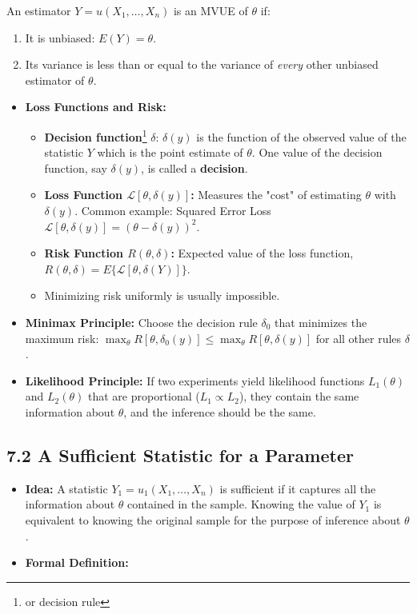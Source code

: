 \begin{definition}
An estimator $Y = u(X_1, \dots, X_n)$ is an MVUE of $\theta$ if:
	\begin{enumerate}
		\item It is unbiased: $E(Y) = \theta$.
		\item Its variance is less than or equal to the variance of \textit{every} other unbiased estimator of $\theta$.
	\end{enumerate}
\end{definition}
\begin{itemize}
	\item \textbf{Loss Functions and Risk:}
	\begin{itemize}
		\item \textbf{Decision function}\footnote{or decision rule} $\delta$: $\delta (y)$ is the function of the observed value of the statistic $Y$ which is the point estimate of $\theta$. One value of the decision function, say $\delta(y)$, is called a \textbf{decision}.
		\item \textbf{Loss Function $\mathcal{L}[\theta, \delta(y)]$:} Measures the "cost" of estimating $\theta$ with $\delta(y)$. Common example: Squared Error Loss $\mathcal{L}[\theta, \delta(y)] = (\theta - \delta(y))^2$.
		\item \textbf{Risk Function $R(\theta, \delta)$:} Expected value of the loss function, $R(\theta, \delta) = E\{\mathcal{L}[\theta, \delta(Y)]\}$.
		\item Minimizing risk uniformly is usually impossible.
	\end{itemize}
	\item \textbf{Minimax Principle:} Choose the decision rule $\delta_0$ that minimizes the maximum risk: $\max_{\theta} R[\theta, \delta_{0}(y)] \leq \max_{\theta} R[\theta, \delta(y)]$ for all other rules $\delta$.
	\item \textbf{Likelihood Principle:} If two experiments yield likelihood functions $L_1(\theta)$ and $L_2(\theta)$ that are proportional ($L_1 \propto L_2$), they contain the same information about $\theta$, and the inference should be the same.
\end{itemize}

\subsection{7.2 A Sufficient Statistic for a Parameter}

\begin{itemize}
	\item \textbf{Idea:} A statistic $Y_1 = u_1(X_1, \dots, X_n)$ is sufficient if it captures all the information about $\theta$ contained in the sample. Knowing the value of $Y_1$ is equivalent to knowing the original sample for the purpose of inference about $\theta$.
	\item \textbf{Formal Definition:}
\end{itemize}

